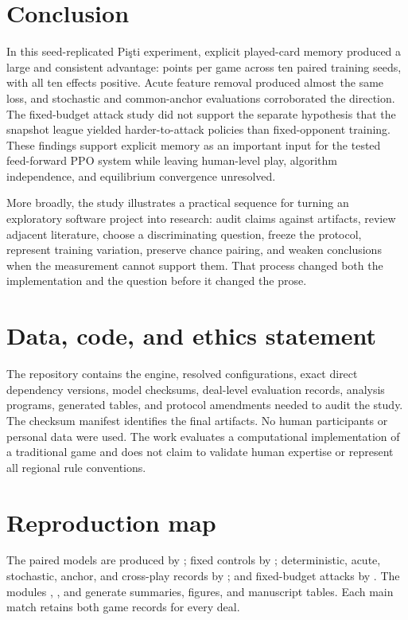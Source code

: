 \documentclass[10pt]{article}
\newcommand{\pisti}{Pişti}
\begin{document}
\section{Conclusion}

In this seed-replicated \pisti{} experiment, explicit played-card memory produced a large and consistent advantage: \DirectMean{} points per game across ten paired training seeds, with all ten effects positive. Acute feature removal produced almost the same loss, and stochastic and common-anchor evaluations corroborated the direction. The fixed-budget attack study did not support the separate hypothesis that the snapshot league yielded harder-to-attack policies than fixed-opponent training. These findings support explicit memory as an important input for the tested feed-forward PPO system while leaving human-level play, algorithm independence, and equilibrium convergence unresolved.

More broadly, the study illustrates a practical sequence for turning an exploratory software project into research: audit claims against artifacts, review adjacent literature, choose a discriminating question, freeze the protocol, represent training variation, preserve chance pairing, and weaken conclusions when the measurement cannot support them. That process changed both the implementation and the question before it changed the prose.

\section*{Data, code, and ethics statement}

The repository contains the engine, resolved configurations, exact direct dependency versions, model checksums, deal-level evaluation records, analysis programs, generated tables, and protocol amendments needed to audit the study. The checksum manifest identifies the final artifacts. No human participants or personal data were used. The work evaluates a computational implementation of a traditional game and does not claim to validate human expertise or represent all regional rule conventions.




\appendix
\section{Reproduction map}

The paired models are produced by ; fixed controls by ; deterministic, acute, stochastic, anchor, and cross-play records by ; and fixed-budget attacks by . The modules , , and  generate summaries, figures, and manuscript tables. Each main match retains both game records for every deal.
\end{document}

